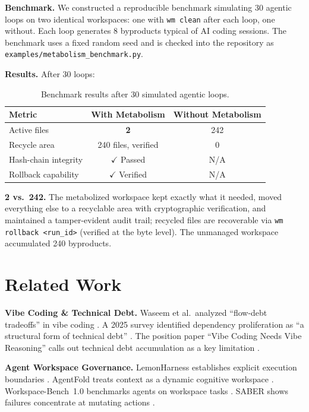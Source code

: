 \documentclass[sigconf]{acmart}
\begin{document}
\textbf{Benchmark.} We constructed a reproducible benchmark simulating 30 agentic loops on two identical workspaces: one with \texttt{wm clean} after each loop, one without. Each loop generates 8 byproducts typical of AI coding sessions. The benchmark uses a fixed random seed and is checked into the repository as \texttt{examples/metabolism\_benchmark.py}.

\textbf{Results.} After 30 loops:
\begin{table}[h]
\caption{Benchmark results after 30 simulated agentic loops.}
\label{tab:results}
\begin{tabular}{lcc}
\textbf{Metric} & \textbf{With Metabolism} & \textbf{Without Metabolism}\\
\hline
Active files & \textbf{2} & 242\\
Recycle area & 240 files, verified & 0\\
Hash-chain integrity & $\checkmark$ Passed & N/A\\
Rollback capability & $\checkmark$ Verified & N/A\\
\end{tabular}
\end{table}

\textbf{2 vs.\ 242.} The metabolized workspace kept exactly what it needed, moved everything else to a recyclable area with cryptographic verification, and maintained a tamper-evident audit trail; recycled files are recoverable via \texttt{wm rollback <run\_id>} (verified at the byte level). The unmanaged workspace accumulated 240 byproducts.

\section{Related Work}
\textbf{Vibe Coding \& Technical Debt.} Waseem et al.\ analyzed ``flow-debt tradeoffs'' in vibe coding \cite{waseem2025}. A 2025 survey identified dependency proliferation as ``a structural form of technical debt'' \cite{vibesurvey2025}. The position paper ``Vibe Coding Needs Vibe Reasoning'' calls out technical debt accumulation as a key limitation \cite{position2025}.

\textbf{Agent Workspace Governance.} LemonHarness establishes explicit execution boundaries \cite{ren2026lemonharness}. AgentFold treats context as a dynamic cognitive workspace \cite{tongyi2025agentfold}. Workspace-Bench~1.0 benchmarks agents on workspace tasks \cite{tang2026workspacebench}. SABER shows failures concentrate at mutating actions \cite{saber2025}.
\end{document}
